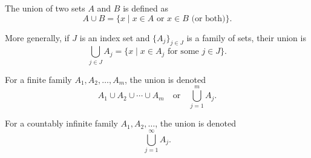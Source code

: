 The union of two sets $A$ and $B$ is defined as
$$A \cup B = \{x \mid x \in A \text{ or } x \in B \text{ (or both)}\}.$$

More generally, if $J$ is an index set and $\{A_j\}_{j \in J}$ is a family of sets, their union is
$$\bigcup_{j \in J} A_j = \{x \mid x \in A_j \text{ for some } j \in J\}.$$

For a finite family $A_1, A_2, \ldots, A_m$, the union is denoted
$$A_1 \cup A_2 \cup \cdots \cup A_m \quad \text{or} \quad \bigcup_{j=1}^{m} A_j.$$

For a countably infinite family $A_1, A_2, \ldots$, the union is denoted
$$\bigcup_{j=1}^{\infty} A_j.$$
